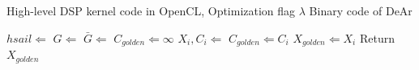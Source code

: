 \begin{algorithm}[h]
    \caption{}
    \begin{algorithmic}[1]
        \Require 
        High-level DSP kernel code in OpenCL, Optimization flag $\lambda$
        \Ensure 
        Binary code of DeAr

        \State $hsail \Leftarrow$ 
        \label{line:tohsail}
        \State $G \Leftarrow$ 
        \label{line:trans}
        \State $\bar{G} \Leftarrow$ 
        \label{line:trane}
        \State $C_{golden} \Leftarrow  \infty$
        \label{line:optstart}
        \label{line:forlambda}
        \State $X_i, C_i \Leftarrow$ 
        \State $C_{golden} \Leftarrow C_i$
        \State $X_{golden} \Leftarrow X_i$
        \EndIf
        \EndFor
        \State Return $X_{golden}$
        \label{line:optend}
    \end{algorithmic}
    \label{alg:framework}
\end{algorithm}

